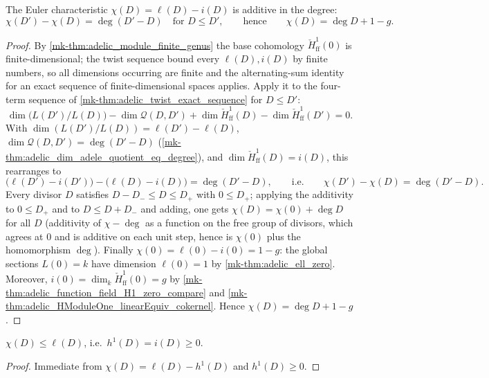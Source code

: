 \begin{theorem}
  \label{mk-thm:adelic_chi_eq_chi_zero_add_degree}
  The Euler characteristic \(\chi(D) = \ell(D) - i(D)\) is additive in the
  degree:
  \[
    \chi(D') - \chi(D) = \deg(D' - D)
    \quad\text{for } D \le D',
    \qquad\text{hence}\qquad
    \chi(D) = \deg D + 1 - g .
  \]
\end{theorem}
\begin{proof}
  By \ref{mk-thm:adelic_module_finite_genus} the base cohomology
  \(\check{H}^1_{\mathrm{ff}}(0)\) is finite-dimensional; the twist sequence
  bound every \(\ell(D), i(D)\) by finite numbers, so all dimensions
  occurring are finite and the alternating-sum identity for an exact
  sequence of finite-dimensional spaces applies. Apply it to the
  four-term sequence of \ref{mk-thm:adelic_twist_exact_sequence} for
  \(D \le D'\):
  \[
    \dim\!\bigl(L(D')/L(D)\bigr) - \dim \mathcal{Q}(D, D')
      + \dim \check{H}^1_{\mathrm{ff}}(D)
      - \dim \check{H}^1_{\mathrm{ff}}(D') = 0 .
  \]
  With \(\dim(L(D')/L(D)) = \ell(D') - \ell(D)\),
  \(\dim \mathcal{Q}(D, D') = \deg(D' - D)\)
  (\ref{mk-thm:adelic_dim_adele_quotient_eq_degree}), and
  \(\dim \check{H}^1_{\mathrm{ff}}(D) = i(D)\), this rearranges to
  \[
    \bigl(\ell(D') - i(D')\bigr) - \bigl(\ell(D) - i(D)\bigr)
      = \deg(D' - D),
    \qquad\text{i.e.}\qquad \chi(D') - \chi(D) = \deg(D' - D).
  \]
  Every divisor \(D\) satisfies \(D - D_- \le D \le D_+\) with
  \(0 \le D_+\); applying the additivity to \(0 \le D_+\) and to
  \(D \le D + D_-\) and adding, one gets \(\chi(D) = \chi(0) + \deg D\)
  for all \(D\) (additivity of \(\chi - \deg\) as a function on the free
  group of divisors, which agrees at \(0\) and is additive on each unit
  step, hence is \(\chi(0)\) plus the homomorphism \(\deg\)). Finally
  \(\chi(0) = \ell(0) - i(0) = 1 - g\): the global sections
  \(L(0)=k\) have dimension \(\ell(0)=1\) by
  \ref{mk-thm:adelic_ell_zero}.  Moreover,
  \(i(0)=\dim_k\check H^1_{\mathrm{ff}}(0)=g\) by
  \ref{mk-thm:adelic_function_field_H1_zero_compare} and
  \ref{mk-thm:adelic_HModuleOne_linearEquiv_cokernel}. Hence
  \(\chi(D) = \deg D + 1 - g\).
\end{proof}

\begin{lemma}
  \label{mk-lem:adelic_chi_le_ell}
  \leanok
  \(\chi(D) \le \ell(D)\), i.e.\ \(h^1(D) = i(D) \ge 0\).
\end{lemma}
\begin{proof}
  \leanok
  Immediate from \(\chi(D) = \ell(D) - h^1(D)\) and \(h^1(D) \ge 0\).
\end{proof}

